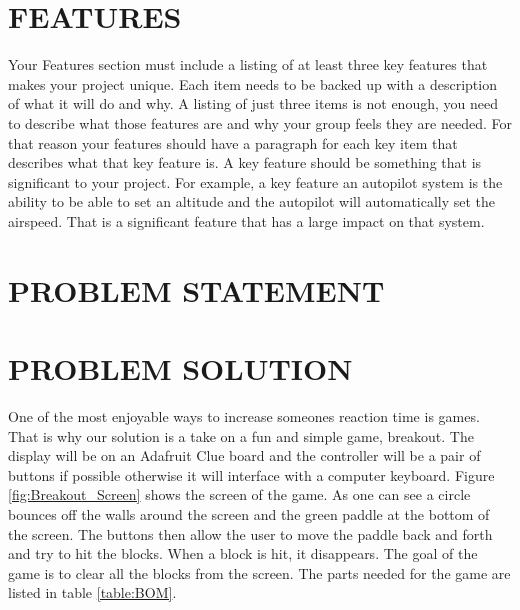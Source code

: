 \documentclass[12pt]{article}
\begin{document}
\section{FEATURES}
Your Features section must include a listing of at least three key features that makes your project unique. Each item needs to be backed up with a description of what it will do and why. A listing of just three items is not enough, you need to describe what those features are and why your group feels they are needed. For that reason your features should have a paragraph for each key item that describes what that key feature is. A key feature should be something that is significant to your project. For example, a key feature an autopilot system is the ability to be able to set an altitude and the autopilot will automatically set the airspeed. That is a significant feature that has a large impact on that system.


\section{PROBLEM STATEMENT}




\section{PROBLEM SOLUTION}
One of the most enjoyable ways to increase someones reaction time is games. That is why our solution is a take on a fun and simple game, breakout. The display will be on an Adafruit Clue board and the controller will be a pair of buttons if possible otherwise it will interface with a computer keyboard. Figure \ref{fig:Breakout_Screen} shows the screen of the game. As one can see a circle bounces off the walls around the screen and the green paddle at the bottom of the screen. The buttons then allow the user to move the paddle back and forth and try to hit the blocks. When a block is hit, it disappears. The goal of the game is to clear all the blocks from the screen. The parts needed for the game are listed in table \ref{table:BOM}.
\end{document}
